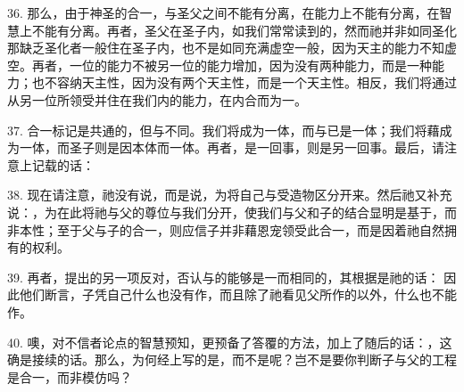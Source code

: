 36. 那么，由于神圣的合一，与圣父之间不能有分离，在能力上不能有分离，在智慧上不能有分离。再者，圣父在圣子内，如我们常常读到的，然而祂并非如同圣化那缺乏圣化者一般住在圣子内，也不是如同充满虚空一般，因为天主的能力不知虚空。再者，一位的能力不被另一位的能力增加，因为没有两种能力，而是一种能力；也不容纳天主性，因为没有两个天主性，而是一个天主性。相反，我们将通过从另一位所领受并住在我们内的能力，在内合而为一。\par

37. 合一标记是共通的，但与不同。我们将成为一体，而与已是一体；我们将藉成为一体，而圣子则是因本体而一体。再者，是一回事，则是另一回事。最后，请注意上记载的话：\par

38. 现在请注意，祂没有说，而是说，为将自己与受造物区分开来。然后祂又补充说：，为在此将祂与父的尊位与我们分开，使我们与父和子的结合显明是基于，而非本性；至于父与子的合一，则应信子并非藉恩宠领受此合一，而是因着祂自然拥有的权利。\par

\par

39. 再者，提出的另一项反对，否认与的能够是一而相同的，其根据是祂的话： 因此他们断言，子凭自己什么也没有作，而且除了祂看见父所作的以外，什么也不能作。\par

40. 噢，对不信者论点的智慧预知，更预备了答覆的方法，加上了随后的话：，这确是接续的话。那么，为何经上写的是，而不是呢？岂不是要你判断子与父的工程是合一，而非模仿吗？\par

